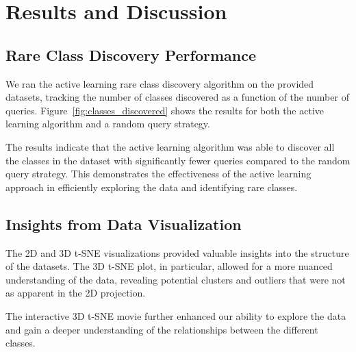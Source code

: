 
\section{Results and Discussion}
\subsection{Rare Class Discovery Performance}
We ran the active learning rare class discovery algorithm on the provided datasets, tracking the number of classes discovered as a function of the number of queries. Figure~\ref{fig:classes_discovered} shows the results for both the active learning algorithm and a random query strategy.


The results indicate that the active learning algorithm was able to discover all the classes in the dataset with significantly fewer queries compared to the random query strategy. This demonstrates the effectiveness of the active learning approach in efficiently exploring the data and identifying rare classes.

\subsection{Insights from Data Visualization}
The 2D and 3D t-SNE visualizations provided valuable insights into the structure of the datasets. The 3D t-SNE plot, in particular, allowed for a more nuanced understanding of the data, revealing potential clusters and outliers that were not as apparent in the 2D projection.

The interactive 3D t-SNE movie further enhanced our ability to explore the data and gain a deeper understanding of the relationships between the different classes.


